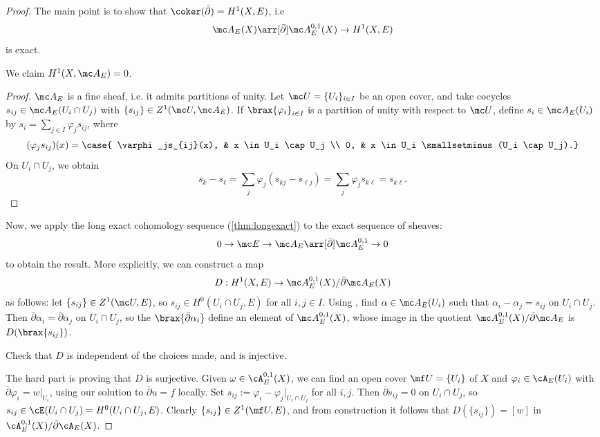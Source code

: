\documentclass[11pt]{report}
\begin{document}
\begin{proof}
The main point is to show that $\coker (\bar \partial)= H^1(X,E)$, i.e
\[
\mc A_E(X) \arr[\bar \partial] \mc A_E^{0,1}(X) \to H^1(X,E)
\]
is exact.
\begin{lem} \label{lem:H1XAE-cohom-is-0}
We claim $H^1(X,\mc A_E)=0$.
\end{lem}
\begin{proof}
$\mc A_E$ is a fine sheaf, i.e. it admits partitions of unity. Let $\mc U = \{U_i\}_{i \in I}$ be an open cover, and take cocycles $s_{ij} \in \mc A_E(U_i \cap U_j)$ with $\{s_{ij}\} \in Z^1(\mc U, \mc A_E)$. If $\brax{\varphi_i}_{i \in I}$ is a partition of unity with respect to $\mc U$, define $s_i \in \mc A_E(U_i)$ by $s_i = \sum_{j \in I} \varphi_j s_{ij}$, where 
\[
(\varphi_js_{ij})(x)=\case{ \varphi_js_{ij}(x), & x \in U_i \cap U_j \\ 0, & x \in U_i \smallsetminus (U_i \cap U_j).}
\]
On $U_i \cap U_j$, we obtain
\[
s_k - s_\ell = \sum_j \varphi_j(s_{kj}-s_{\ell j})= \sum_j \varphi_j s_{k\ell}=s_{k\ell}.
\]
\end{proof}
Now, we apply the long exact cohomology sequence (\cref{thm:longexact}) to the exact sequence of sheaves:
\[
0 \to \mc E \to \mc A_E \arr[\bar \partial] \mc A_E^{0,1}\to 0
\]
to obtain the result. More explicitly, we can construct a map
\begin{align} \label{eq:H1-A-quotient-isom}
    D:H^1(X,E) \to \mc A_E^{0,1}(X)/\bar \partial \mc A_E(X)
\end{align}
as follows: let $\{s_{ij}\} \in Z^1(\mc U, E)$, so $s_{ij} \in H^0(U_i \cap U_j, E)$ for all $i,j \in I$. Using , find $\alpha \in \mc A_E(U_i)$ such that $\alpha _i - \alpha _j = s_{ij}$ on $U_i \cap U_j$. Then $\bar \partial \alpha _i = \bar \partial \alpha _j$ on $U_i \cap U_j$, so the $\brax{\bar \partial \alpha_i}$ define an element of $\mc A^{0,1}_E(X)$, whose image in the quotient $\mc A_E^{0,1}(X)/\bar \partial \mc A_E$ is $D(\brax{s_{ij}})$.
\begin{exercise}
Check that $D$ is independent of the choices made, and is injective.
\end{exercise}
The hard part is proving that $D$ is surjective. Given $\omega \in \cA^{0,1}_E(X)$, we can find an open cover $\mf U = \{U_i\}$ of $X$ and $\varphi_i \in \cA_E(U_i)$ with $\bar \partial \varphi_i = w|_{U_i}$, using our solution to $\bar \partial u =f$ locally. Set $s_{ij}:= \varphi_i-\varphi_j |_{U_i \cap U_j}$ for all $i,j$. Then $\bar \partial s_{ij}=0$ on $U_i \cap U_j$, so $s_{ij} \in \cE (U_i \cap U_j)=H^0(U_i \cap U_j,E)$. Clearly $\{s_{ij}\} \in Z^1(\mf U,E)$, and from construction it follows that $D(\{s_{ij}\}) = [w]$ in $\cA_E^{0,1}(X)/\bar \partial \cA_E(X)$.
\end{proof}
\end{document}

